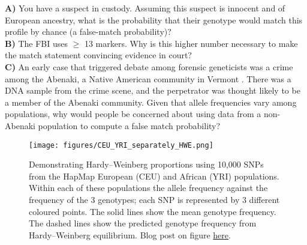 {{\begin{question}{}
{\bf A)} You have a suspect in custody. Assuming this suspect is innocent and of European ancestry, what is the probability
that their genotype would match this profile by chance (a false-match probability)?\\
{\bf B)} The FBI uses $\geq$ 13 markers. Why is this higher number
necessary to make the match statement convincing evidence in court?\\
{\bf C)}  An early case that triggered debate among forensic geneticists was a crime among the Abenaki, a Native American community in
Vermont \citep[see][for discussion]{lewontin:94}. There was a DNA sample from the crime scene, and the
perpetrator was thought likely to be a member of the Abenaki
community. Given that allele frequencies vary among populations, why would people be concerned about using data from a non-Abenaki population to compute a false match probability?
\end{question}


\begin{figure}[!h]
\begin{center}
\texttt{[image: figures/CEU\_YRI\_separately\_HWE.png]}
\end{center}
\caption{Demonstrating Hardy--Weinberg proportions using 10,000 SNPs
  from the HapMap European (CEU)  and African (YRI) populations. Within
  each of these populations the allele frequency against the
  frequency of the 3 genotypes; each SNP is represented by 3 different
  coloured points. The solid lines show the mean genotype frequency. The dashed lines show the
  predicted genotype frequency from Hardy--Weinberg
  equilibrium.  Blog
  post on figure \href{http://gcbias.org/2011/10/13/population-genetics-course-resources-Hardy--Weinberg-eq/}{here}. } \label{fig:HWE_CEU_YRI}  %
\end{figure}





}}

